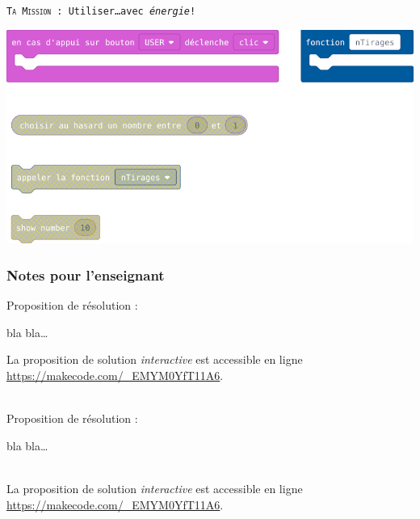 \begin{eleve}
    \texttt{\textsc{Ta Mission} : Utiliser\ldots avec \emph{énergie}!}

    \includegraphics[width=0.5\linewidth]{res/st-pf-00-eleve.png}
\end{eleve}



\subsubsection{Notes pour l'enseignant}

%
%
\begin{methode}
Proposition de résolution :

bla bla\ldots
\end{methode}


\begin{remarque}
    La proposition de solution \emph{interactive} est accessible en ligne \url{https://makecode.com/_EMYM0YfT11A6}.
\end{remarque}


%

\begin{minipage}[t]{0.7\linewidth}
    \begin{methode}~\\
    Proposition de résolution :

    bla bla\ldots
    \end{methode}
\end{minipage}
\hfill
\begin{minipage}[t]{0.3\linewidth}
    \begin{remarque}~\\
        La proposition de solution \emph{interactive} est accessible en ligne \url{https://makecode.com/_EMYM0YfT11A6}.
    \end{remarque}
\end{minipage}
